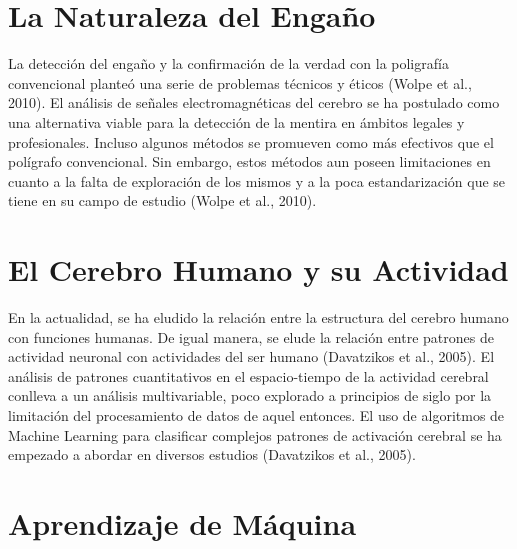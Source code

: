 \section{La Naturaleza del Engaño}
La detección del engaño y la confirmación de la verdad con la poligrafía convencional planteó una serie de problemas técnicos y éticos (Wolpe et al., 2010).  El análisis de señales electromagnéticas del cerebro se ha postulado como una alternativa viable para la detección de la mentira en ámbitos legales y profesionales. Incluso algunos métodos se promueven como más efectivos que el polígrafo convencional. Sin embargo, estos métodos aun poseen limitaciones en cuanto a la falta de exploración de los mismos y a la poca estandarización que se tiene en su campo de estudio (Wolpe et al., 2010). 
\section{El Cerebro Humano y su Actividad}
En la actualidad, se ha eludido la relación entre la estructura del cerebro humano con funciones humanas. De igual manera, se elude la relación entre patrones de actividad neuronal con actividades del ser humano (Davatzikos et al., 2005). El análisis de patrones cuantitativos en el espacio-tiempo de la actividad cerebral conlleva a un análisis multivariable, poco explorado a principios de siglo por la limitación del procesamiento de datos de aquel entonces. El uso de algoritmos de Machine Learning para clasificar complejos patrones de activación cerebral se ha empezado a abordar en diversos estudios (Davatzikos et al., 2005). 
\section{Aprendizaje de Máquina}

